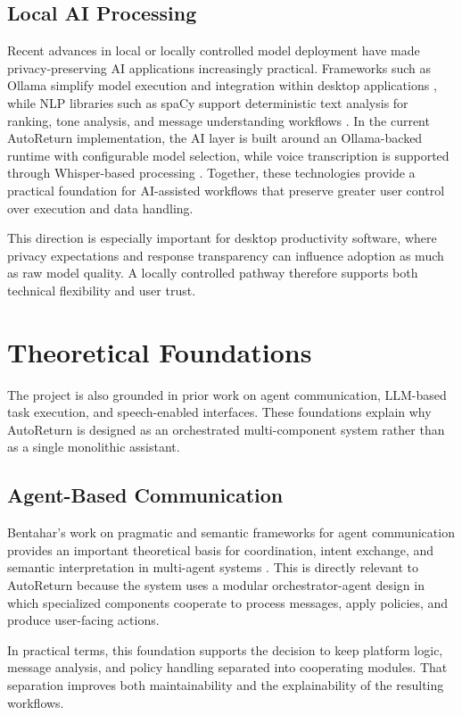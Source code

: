 \subsection{Local AI Processing}
Recent advances in local or locally controlled model deployment have made privacy-preserving AI applications increasingly practical. Frameworks such as Ollama simplify model execution and integration within desktop applications \cite{ollama2024}, while NLP libraries such as spaCy support deterministic text analysis for ranking, tone analysis, and message understanding workflows \cite{spacy2024}. In the current AutoReturn implementation, the AI layer is built around an Ollama-backed runtime with configurable model selection, while voice transcription is supported through Whisper-based processing \cite{whisper2023}. Together, these technologies provide a practical foundation for AI-assisted workflows that preserve greater user control over execution and data handling.

This direction is especially important for desktop productivity software, where privacy expectations and response transparency can influence adoption as much as raw model quality. A locally controlled pathway therefore supports both technical flexibility and user trust.

\section{Theoretical Foundations}
\noindent The project is also grounded in prior work on agent communication, LLM-based task execution, and speech-enabled interfaces. These foundations explain why AutoReturn is designed as an orchestrated multi-component system rather than as a single monolithic assistant.

\subsection{Agent-Based Communication}
Bentahar's work on pragmatic and semantic frameworks for agent communication provides an important theoretical basis for coordination, intent exchange, and semantic interpretation in multi-agent systems \cite{bentahar2005}. This is directly relevant to AutoReturn because the system uses a modular orchestrator-agent design in which specialized components cooperate to process messages, apply policies, and produce user-facing actions.

In practical terms, this foundation supports the decision to keep platform logic, message analysis, and policy handling separated into cooperating modules. That separation improves both maintainability and the explainability of the resulting workflows.

